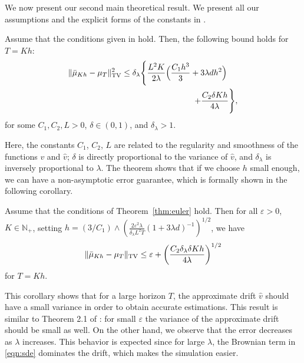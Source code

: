 We now present our second main theoretical result. We present all our assumptions and the explicit forms of the constants in \supp. 
\vspace{-5pt}
\begin{thm}
\label{thm:euler}
Assume that the conditions given in \supp{} hold. Then, the following bound holds for $T=Kh$:
\begin{align}
\nonumber \| \bar{\mu}_{Kh} - \mu_T \|_{\textnormal{TV}}^2 \leq \delta_\lambda \Biggl\{  \frac{L^2 K}{2\lambda} \Bigl( \frac{C_1 h^3}{3} + 3 \lambda d h^2 \Bigr) \hspace{13pt} \\ + \frac{C_2  \delta K h}{4\lambda} \Biggr\}	,
\end{align} 
for some $C_1,C_2,L >0$, $\delta \in (0,1)$, and $\delta_\lambda >1$.  %
\end{thm}
Here, the constants $C_1$, $C_2$, $L$ are related to the regularity and smoothness of the functions $v$ and $\hat{v}$; $\delta$ is directly proportional to the variance of $\hat{v}$, and $\delta_\lambda$ is inversely proportional to $\lambda$. The theorem shows that 
% 
if we choose $h$ small enough, we can have a non-asymptotic error guarantee, which is formally shown in the following corollary. 
\vspace{-5pt}
\begin{cor}
  \label{coro:precision}
  Assume that the conditions of Theorem~\ref{thm:euler} hold. Then for all $\varepsilon >0$, $K \in \mathbb{N}_+$, setting
$h = (3/C_1)\wedge\left(\frac{2 \varepsilon^2 \lambda}{\delta_\lambda L^2 T}(1+3\lambda d)^{-1}\right)^{1/2}$, %
  we have
  \begin{align}
    \| \bar{\mu}_{Kh} - \mu_T \|_{\textnormal{TV}} \leq \varepsilon + \left(\frac{C_2 \delta_\lambda \delta K h}{4\lambda}\right)^{1/2} 
  \end{align}
  for $T=Kh$.
\end{cor}
This corollary shows that for a large horizon $T$, the approximate drift $\hat{v}$ should have a small variance in order to obtain accurate estimations. This result is similar to Theorem 2.1 of \cite{raginsky17a}: for small $\varepsilon$ the variance of the approximate drift should be small as well. On the other hand, we observe that the error decreases as $\lambda$ increases. This behavior is expected since for large $\lambda$, the Brownian term in \eqref{eqn:sde} dominates the drift, which makes the simulation easier.


